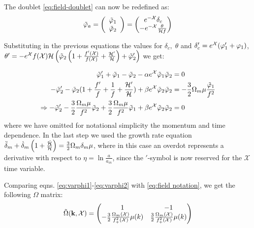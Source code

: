 The doublet \ref{eq:field-doublet} can now be redefined as: 
\begin{equation}
\tilde{\varphi}_{a}=\left(\begin{array}{c}
\tilde{\varphi}_{1}\\
\tilde{\varphi}_{2}
\end{array}\right)=\begin{pmatrix}e^{-\mathcal{X}}\delta_{c}\\
-e^{-\mathcal{X}}\frac{\theta}{\mathcal{H} f}
\end{pmatrix}\label{eq:field-redefinition}
\end{equation}


Substituting in the previous equations the values for $\delta_{c},\;\theta$
and $\delta'_{c}=e^{\mathcal{X}}(\varphi'_{1}+\varphi_{1})$, $\theta'=-e^{\mathcal{X}}f(\mathcal{X})\mathcal{H}\left(\tilde{\varphi}_{2}\left(1+\frac{f'(\mathcal{X})}{f(\mathcal{X})}+\frac{\mathcal{H}'}{\mathcal{H}}\right)+\tilde{\varphi}'_{2}\right)$
we get:

\begin{align}
\tilde{\varphi}_{1}'+\tilde{\varphi}_{1}-\tilde{\varphi}_{2}-\alpha e^{\mathcal{X}}\tilde{\varphi}_{1}\tilde{\varphi}_{2} & =0\label{eq:varphi1}\\
-\tilde{\varphi}'_{2}-\tilde{\varphi}_{2}(1+\frac{f'}{f}+\frac{1}{f}+\frac{\mathcal{H}'}{\mathcal{H}})+\beta e^{\mathcal{X}}\tilde{\varphi}_{2}\tilde{\varphi}_{2} & =-\frac{3}{2}\Omega_{m}\mu\frac{\tilde{\varphi}_{1}}{f^{2}}\nonumber \\
\Rightarrow-\tilde{\varphi}'_{2}-\frac{3}{2}\frac{\Omega_{m}\mu}{f^{2}}\tilde{\varphi}_{2}+\frac{3}{2}\frac{\Omega_{m}\mu}{f^{2}}\tilde{\varphi}_{1}+\beta e^{\mathcal{X}}\tilde{\varphi}_{2}\tilde{\varphi}_{2} & =0\label{eq:varphi2}
\end{align}
where we have omitted for notational simplicity the momentum and time
dependence. In the last step we used the growth rate equation $\ddot{\delta}_{m}+\dot{\delta}_{m}\left(1+\frac{\dot{\mathcal{H}}}{\mathcal{H}}\right)=\frac{3}{2}\Omega_{m}\delta_{m}\mu$,
where in this case an overdot represents a derivative with respect
to $\eta=\ln\frac{a}{a_{in}}$, since the $'$-symbol is now reserved
for the $\mathcal{X}$ time variable.

Comparing eqns. \ref{eq:varphi1}-\ref{eq:varphi2} with \ref{eq:field notation},
we get the following $\Omega$ matrix: 
\begin{equation}
\tilde{\Omega}(\mathbf{k},\mathcal{X})=\begin{pmatrix}1 & -1\\
-\frac{3}{2}\frac{\Omega_{m}(\mathcal{X})}{f_{+}^{2}(\mathcal{X})}\mu(k) & \frac{3}{2}\frac{\Omega_{m}(\mathcal{X})}{f_{+}^{2}(\mathcal{X})}\mu(k)
\end{pmatrix}\label{eq:omegamatrix-horn}
\end{equation}


